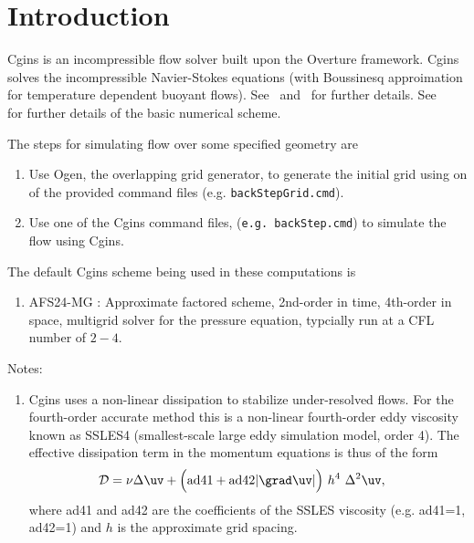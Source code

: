 \documentclass[11pt]{article}
\begin{document}
\tableofcontents

\clearpage


\section{Introduction}

Cgins is an incompressible flow solver built upon the Overture framework.
Cgins solves the incompressible Navier-Stokes equations (with Boussinesq approimation
for temperature dependent buoyant flows). See~\cite{CginsUserGuide} and~\cite{CginsReferenceManual} for further 
details. See~\cite{ICNS}~\cite{splitStep2003} for further details of the basic numerical scheme. 

The steps for simulating flow over some specified geometry are
\begin{enumerate}
  \item Use Ogen, the overlapping grid generator, to generate the initial grid using on of the provided command files (e.g. {\tt backStepGrid.cmd}).
  \item Use one of the Cgins command files,  ({\tt e.g. backStep.cmd}) to simulate the flow using Cgins.
\end{enumerate}

The default Cgins scheme being used in these computations is 
\begin{enumerate}
  \item AFS24-MG : Approximate factored scheme, 2nd-order in time, 4th-order in space, multigrid solver for the pressure equation,
    typcially run at a CFL number of $2-4$. 
\end{enumerate}

Notes:
\begin{enumerate}
  \item Cgins uses a non-linear dissipation to stabilize under-resolved flows. For the fourth-order accurate method this is
    a non-linear fourth-order eddy viscosity known as SSLES4 (smallest-scale large eddy simulation model, order 4).
  The effective dissipation term in the momentum equations is thus of the form
  \begin{align*}
     \Dc & =  \nu \Delta \uv  + \Big(\text{ad41} + \text{ad42} \vert \grad\uv\vert \Big) ~h^4~ \Delta^2 \uv , 
  \end{align*}
  where ad41 and ad42 are the coefficients of the SSLES viscosity (e.g. ad41=1, ad42=1) and $h$ is the approximate grid spacing.
\end{enumerate}
\end{document}
